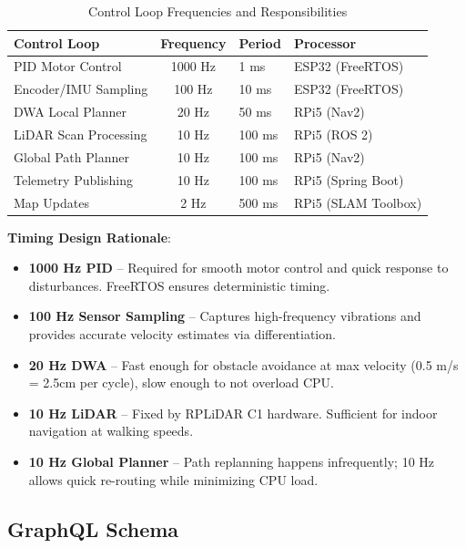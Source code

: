 \begin{table}[H]
\centering
\caption{Control Loop Frequencies and Responsibilities}
\begin{tabular}{|l|c|l|l|}
\hline
\textbf{Control Loop} & \textbf{Frequency} & \textbf{Period} & \textbf{Processor} \\
\hline
PID Motor Control & 1000 Hz & 1 ms & ESP32 (FreeRTOS) \\
\hline
Encoder/IMU Sampling & 100 Hz & 10 ms & ESP32 (FreeRTOS) \\
\hline
DWA Local Planner & 20 Hz & 50 ms & RPi5 (Nav2) \\
\hline
LiDAR Scan Processing & 10 Hz & 100 ms & RPi5 (ROS 2) \\
\hline
Global Path Planner & 10 Hz & 100 ms & RPi5 (Nav2) \\
\hline
Telemetry Publishing & 10 Hz & 100 ms & RPi5 (Spring Boot) \\
\hline
Map Updates & 2 Hz & 500 ms & RPi5 (SLAM Toolbox) \\
\hline
\end{tabular}
\end{table}

\textbf{Timing Design Rationale}:
\begin{itemize}
    \item \textbf{1000 Hz PID} -- Required for smooth motor control and quick response to disturbances. FreeRTOS ensures deterministic timing.

    \item \textbf{100 Hz Sensor Sampling} -- Captures high-frequency vibrations and provides accurate velocity estimates via differentiation.

    \item \textbf{20 Hz DWA} -- Fast enough for obstacle avoidance at max velocity (0.5 m/s = 2.5cm per cycle), slow enough to not overload CPU.

    \item \textbf{10 Hz LiDAR} -- Fixed by RPLiDAR C1 hardware. Sufficient for indoor navigation at walking speeds.

    \item \textbf{10 Hz Global Planner} -- Path replanning happens infrequently; 10 Hz allows quick re-routing while minimizing CPU load.
\end{itemize}

\subsection{GraphQL Schema}

